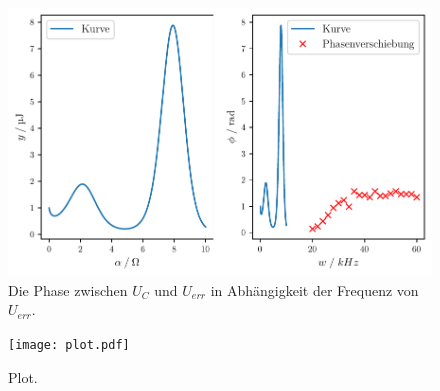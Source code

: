 \begin{figure}
      \centering
      \includegraphics{build/plotd.pdf}
      \caption{Die Phase zwischen $U_C$ und $U_{err}$ in Abhängigkeit der Frequenz von $U_{err}$.}
      \label{fig:plotd}
    \end{figure}


\begin{figure}
  \centering
  \texttt{[image: plot.pdf]}
  \caption{Plot.}
  \label{fig:plot}
\end{figure}


